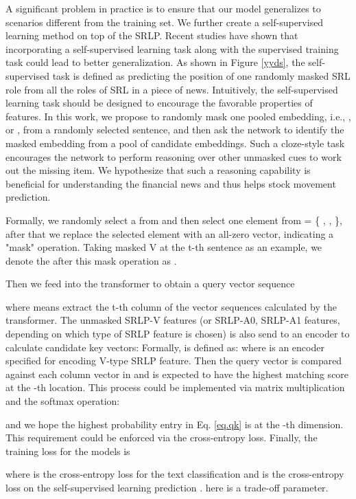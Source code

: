 \documentclass{article}
\begin{document}
A significant problem in practice is to ensure that our model generalizes to scenarios different from the training set. We further create a self-supervised learning method on top of the SRLP. Recent studies \cite{mohseni2020self,hendrycks2019selfsupervised} have shown that incorporating a self-supervised learning task along with the supervised training task could lead to better generalization. As shown in Figure \ref{yyds}, the self-supervised task is defined as predicting the position of one randomly masked SRL role from all the roles of SRL in a piece of news. Intuitively, the self-supervised learning task should be designed to encourage the favorable properties of features. In this work, we propose to randomly mask one pooled embedding, i.e., ,   or , from a randomly selected sentence, and then ask the network to identify the masked embedding from a pool of candidate embeddings. Such a cloze-style task encourages the network to perform reasoning over other unmasked cues to work out the missing item. We hypothesize that such a reasoning capability is beneficial for understanding the financial news and thus helps stock movement prediction. 

Formally, we randomly select a  from  and then select one element from  = \{  ,  ,  \}, after that we replace the selected element with an all-zero vector, indicating a "mask" operation. Taking masked V at the t-th sentence as an example, we denote the  after this mask operation as .

Then we feed  into the transformer to obtain a query vector sequence 

where  means extract the t-th column of the vector sequences calculated by the transformer. The unmasked SRLP-V features (or SRLP-A0, SRLP-A1 features, depending on which type of SRLP feature is chosen) is also send to an encoder to calculate candidate key vectors:
Formally,  is defined as:
 where  is an encoder specified for encoding V-type SRLP feature. Then the query vector is compared against each column vector in  and is expected to have the highest matching score at the -th location. This process could be implemented via matrix multiplication and the softmax operation:


and we hope the highest probability entry in Eq. 
\ref{eq.qk} is at the -th dimension. This requirement could be enforced via the cross-entropy loss. Finally, the training loss for the models is 

where  is the cross-entropy loss for the text classification and  is the cross-entropy loss on the self-supervised learning prediction .  here is a trade-off parameter.
\end{document}
